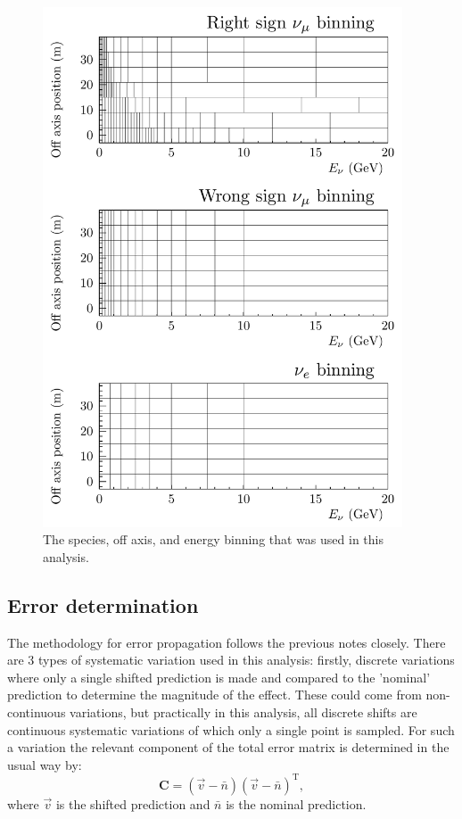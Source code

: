 \documentclass{article}
\begin{document}
\begin{figure}
  \centering
  \includegraphics[width=0.95\textwidth]{plots/Binning}
  \caption{The species, off axis, and energy binning that was used in this analysis.}
  \label{fig:binning}
\end{figure}

\subsection{Error determination}
\label{sec:methodology__error_determination}

The methodology for error propagation follows the previous notes closely.
There are 3 types of systematic variation used in this analysis: firstly, discrete variations where only a single shifted prediction is made and compared to the 'nominal' prediction to determine the magnitude of the effect. These could come from non-continuous variations, but practically in this analysis, all discrete shifts are continuous systematic variations of which only a single point is sampled. For such a variation the relevant component of the total error matrix is determined in the usual way by:
\begin{equation}\mathbf{C} = \left(\vec{v}-\bar{n}\right)\left(\vec{v}-\bar{n}\right)^{\mathrm{T}}\label{eqn:covmx},\end{equation}
where $\vec{v}$ is the shifted prediction and $\bar{n}$ is the nominal prediction.
\end{document}
